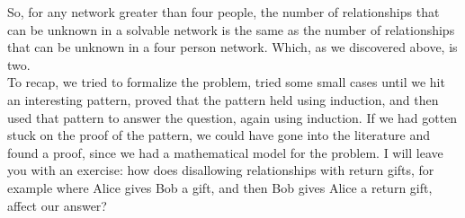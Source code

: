 \documentclass{article}
\begin{document}
So, for any network greater than four people, the number of relationships that can be unknown in a solvable network is the same as the number of relationships that can be unknown in a four person network. Which, as we discovered above, is two.\\

To recap, we tried to formalize the problem, tried some small cases until we hit an interesting pattern, proved that the pattern held using induction, and then used that pattern to answer the question, again using induction. If we had gotten stuck on the proof of the pattern, we could have gone into the literature and found a proof, since we had a mathematical model for the problem. I will leave you with an exercise: how does disallowing relationships with return gifts, for example where Alice gives Bob a gift, and then Bob gives Alice a return gift, affect our answer?\\
\end{document}
